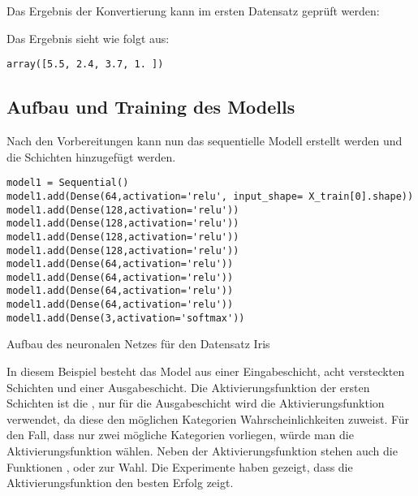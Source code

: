 \medskip



\medskip


Das Ergebnis der Konvertierung kann im ersten Datensatz geprüft werden:

\medskip


\medskip
Das Ergebnis sieht wie folgt aus:

\begin{lstlisting}[numbers=none]
array([5.5, 2.4, 3.7, 1. ])
\end{lstlisting}


\subsection{Aufbau und Training des Modells}


Nach den Vorbereitungen kann nun das sequentielle Modell erstellt werden und die Schichten hinzugefügt werden.

\begin{code}
\begin{lstlisting}[numbers=none]
model1 = Sequential()
model1.add(Dense(64,activation='relu', input_shape= X_train[0].shape))
model1.add(Dense(128,activation='relu'))
model1.add(Dense(128,activation='relu'))
model1.add(Dense(128,activation='relu'))
model1.add(Dense(128,activation='relu'))
model1.add(Dense(64,activation='relu'))
model1.add(Dense(64,activation='relu'))
model1.add(Dense(64,activation='relu'))
model1.add(Dense(64,activation='relu'))
model1.add(Dense(3,activation='softmax'))
\end{lstlisting}

\caption{Aufbau des neuronalen Netzes für den Datensatz Iris}
\end{code}

In diesem Beispiel besteht das Model aus einer Eingabeschicht, acht versteckten Schichten und einer Ausgabeschicht. Die Aktivierungsfunktion der ersten Schichten ist die , nur für die Ausgabeschicht wird die Aktivierungsfunktion  verwendet, da diese den möglichen Kategorien Wahrscheinlichkeiten zuweist. Für den Fall, dass nur zwei mögliche Kategorien vorliegen, würde man die Aktivierungsfunktion  wählen. Neben der Aktivierungsfunktion  stehen auch die Funktionen ,  oder  zur Wahl. Die Experimente haben gezeigt, dass die Aktivierungsfunktion  den besten Erfolg zeigt.

